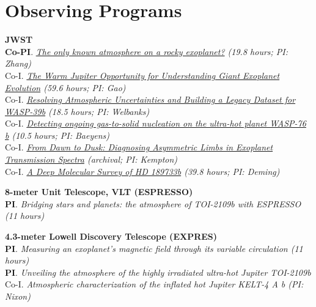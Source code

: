 \documentclass[letterpaper,10.5pt]{article}
\newcommand{\resumeSubHeadingListEnd}{\end{itemize}}
\newcommand{\shorterSection}[1]{\vspace{-10pt}\section{#1}}
\begin{document}

\shorterSection{Observing Programs}

\small
  \begin{list}{}{\cvlist}  

  
  
  \item[{\color{numcolor}}]\textbf{JWST} \\
\textbf{Co-PI}. \textit{\href{https://www.stsci.edu/jwst/science-execution/program-information?id=7875}{The only known atmosphere on a rocky exoplanet?} (19.8 hours; PI: Zhang)} \\
Co-I. \textit{\href{https://www.stsci.edu/jwst/science-execution/program-information?id=9025}{The Warm Jupiter Opportunity for Understanding Giant Exoplanet Evolution} (59.6 
 hours; PI: Gao)} \\
Co-I. \textit{\href{https://www.stsci.edu/jwst/science-execution/program-information?id=8017}{Resolving Atmospheric Uncertainties and Building a Legacy Dataset for WASP-39b} (18.5 hours; PI: Welbanks)} \\
  Co-I. \textit{\href{https://www.stsci.edu/jwst/science-execution/program-information?id=6045}{Detecting ongoing gas-to-solid nucleation on the ultra-hot planet WASP-76 b} (10.5 hours; PI: Baeyens)} \\
  Co-I. \textit{\href{https://www.stsci.edu/jwst/science-execution/program-information?id=5275}{From Dawn to Dusk: Diagnosing Asymmetric Limbs in Exoplanet Transmission Spectra} (archival; PI: Kempton)} \\ 
  Co-I. \textit{\href{https://www.stsci.edu/jwst/science-execution/program-information?id=1633}{A Deep Molecular Survey of HD 189733b} (39.8 hours; PI: Deming)}

  \item[{\color{numcolor}}]\textbf{8-meter Unit Telescope, VLT (ESPRESSO)} \\
\textbf{PI}. \textit{Bridging stars and planets: the atmosphere of TOI-2109b with ESPRESSO (11 hours)} \\

  \item[{\color{numcolor}}]\textbf{4.3-meter Lowell Discovery Telescope (EXPRES)} \\
      \textbf{PI}. \textit{Measuring an exoplanet’s magnetic field through its variable circulation (11 hours)}\\
     \textbf{PI}. \textit{Unveiling the atmosphere of the highly irradiated ultra-hot Jupiter TOI-2109b}\\
     Co-I. \textit{Atmospheric characterization of the inflated hot Jupiter KELT-4 A b (PI: Nixon)}


\end{list}
\end{document}
